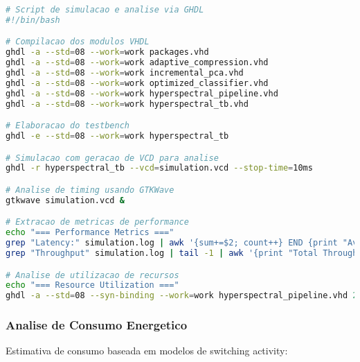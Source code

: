\begin{lstlisting}[language=sh]
# Script de simulacao e analise via GHDL
#!/bin/bash

# Compilacao dos modulos VHDL
ghdl -a --std=08 --work=work packages.vhd
ghdl -a --std=08 --work=work adaptive_compression.vhd
ghdl -a --std=08 --work=work incremental_pca.vhd
ghdl -a --std=08 --work=work optimized_classifier.vhd
ghdl -a --std=08 --work=work hyperspectral_pipeline.vhd
ghdl -a --std=08 --work=work hyperspectral_tb.vhd

# Elaboracao do testbench
ghdl -e --std=08 --work=work hyperspectral_tb

# Simulacao com geracao de VCD para analise
ghdl -r hyperspectral_tb --vcd=simulation.vcd --stop-time=10ms

# Analise de timing usando GTKWave
gtkwave simulation.vcd &

# Extracao de metricas de performance
echo "=== Performance Metrics ==="
grep "Latency:" simulation.log | awk '{sum+=$2; count++} END {print "Average Latency:", sum/count, "cycles"}'
grep "Throughput" simulation.log | tail -1 | awk '{print "Total Throughput:", $2, "pixels processed"}'

# Analise de utilizacao de recursos
echo "=== Resource Utilization ==="
ghdl -a --std=08 --syn-binding --work=work hyperspectral_pipeline.vhd 2>&1 | grep -E "(LUT|FF|DSP|BRAM)"
\end{lstlisting}

\subsubsection{Analise de Consumo Energetico}
Estimativa de consumo baseada em modelos de switching activity:

